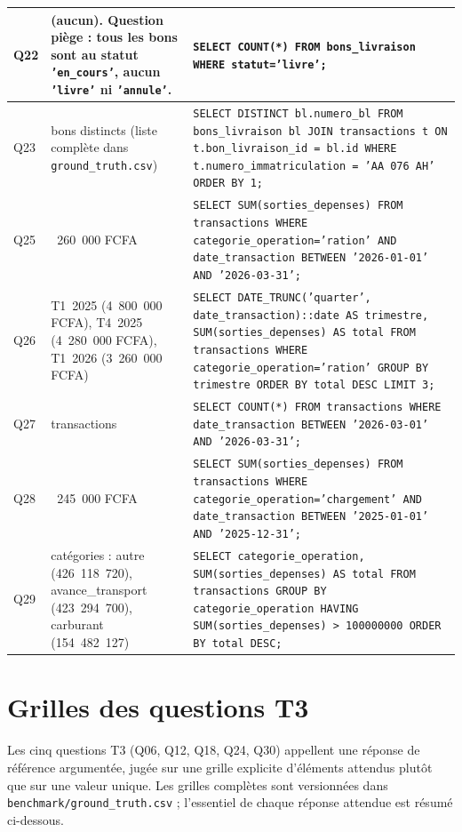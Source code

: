 {\begin{longtable}{|>{\raggedright\arraybackslash}p{0.8cm}|>{\raggedright\arraybackslash}p{4.2cm}|>{\raggedright\arraybackslash}p{8.8cm}|}
Q22 & 0 (aucun). Question piège : tous les bons sont au statut \texttt{'en\_cours'}, aucun \texttt{'livre'} ni \texttt{'annule'}. & \texttt{SELECT COUNT(*) FROM bons\_livraison WHERE statut='livre';} \\ \hline
Q23 & 10 bons distincts (liste complète dans \texttt{ground\_truth.csv}) & \texttt{SELECT DISTINCT bl.numero\_bl FROM bons\_livraison bl JOIN transactions t ON t.bon\_livraison\_id = bl.id WHERE t.numero\_immatriculation = 'AA 076 AH' ORDER BY 1;} \\ \hline
Q25 & 3~260~000 FCFA & \texttt{SELECT SUM(sorties\_depenses) FROM transactions WHERE categorie\_operation='ration' AND date\_transaction BETWEEN '2026-01-01' AND '2026-03-31';} \\ \hline
Q26 & T1~2025 (4~800~000 FCFA), T4~2025 (4~280~000 FCFA), T1~2026 (3~260~000 FCFA) & \texttt{SELECT DATE\_TRUNC('quarter', date\_transaction)::date AS trimestre, SUM(sorties\_depenses) AS total FROM transactions WHERE categorie\_operation='ration' GROUP BY trimestre ORDER BY total DESC LIMIT 3;} \\ \hline
Q27 & 438 transactions & \texttt{SELECT COUNT(*) FROM transactions WHERE date\_transaction BETWEEN '2026-03-01' AND '2026-03-31';} \\ \hline
Q28 & 65~245~000 FCFA & \texttt{SELECT SUM(sorties\_depenses) FROM transactions WHERE categorie\_operation='chargement' AND date\_transaction BETWEEN '2025-01-01' AND '2025-12-31';} \\ \hline
Q29 & 3 catégories : autre (426~118~720), avance\_transport (423~294~700), carburant (154~482~127) & \texttt{SELECT categorie\_operation, SUM(sorties\_depenses) AS total FROM transactions GROUP BY categorie\_operation HAVING SUM(sorties\_depenses) > 100000000 ORDER BY total DESC;} \\ \hline
\end{longtable}
}

\section{Grilles des questions T3}

Les cinq questions T3 (Q06, Q12, Q18, Q24, Q30) appellent une réponse de référence argumentée, jugée sur une grille explicite d'éléments attendus plutôt que sur une valeur unique. Les grilles complètes sont versionnées dans \texttt{benchmark/ground\_truth.csv} ; l'essentiel de chaque réponse attendue est résumé ci-dessous.

